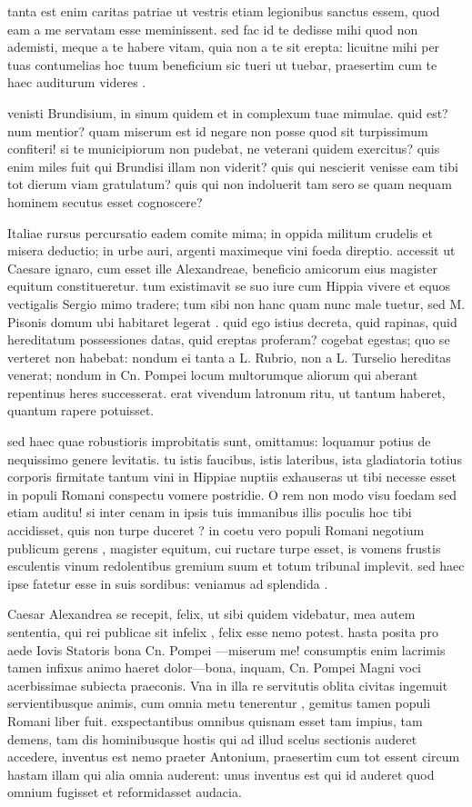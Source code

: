  tanta est enim caritas patriae ut vestris etiam legionibus sanctus essem, quod eam a me servatam esse meminissent. sed fac id te dedisse mihi quod non ademisti, meque a te habere vitam, quia non a te sit erepta: licuitne mihi per tuas contumelias hoc tuum beneficium sic tueri ut tuebar, praesertim cum te haec auditurum videres .

 venisti Brundisium, in sinum quidem et in complexum tuae mimulae. quid est? num mentior? quam miserum est id negare non posse quod sit turpissimum confiteri! si te municipiorum non pudebat, ne veterani quidem exercitus? quis enim miles fuit qui Brundisi illam non viderit? quis qui nescierit venisse eam tibi tot dierum viam gratulatum? quis qui non indoluerit tam sero se quam nequam hominem secutus esset cognoscere?

 Italiae rursus percursatio eadem comite mima; in oppida militum crudelis et misera deductio; in urbe auri, argenti maximeque vini foeda direptio. accessit ut Caesare ignaro, cum esset ille Alexandreae, beneficio amicorum eius magister equitum constitueretur. tum existimavit se suo iure cum Hippia vivere et equos vectigalis Sergio mimo tradere; tum sibi non hanc quam nunc male tuetur, sed M. Pisonis domum ubi habitaret legerat . quid ego istius decreta, quid rapinas, quid hereditatum possessiones datas, quid ereptas proferam? cogebat egestas; quo se verteret non habebat: nondum ei tanta a L. Rubrio, non a L. Turselio hereditas venerat; nondum in Cn. Pompei locum multorumque aliorum qui aberant repentinus heres successerat. erat vivendum latronum ritu, ut tantum haberet, quantum rapere potuisset.

 sed haec quae robustioris improbitatis sunt, omittamus: loquamur potius de nequissimo genere levitatis. tu istis faucibus, istis lateribus, ista gladiatoria totius corporis firmitate tantum vini in Hippiae nuptiis exhauseras ut tibi necesse esset in populi Romani conspectu vomere postridie. O rem non modo visu foedam sed etiam auditu! si inter cenam in ipsis tuis immanibus illis poculis hoc tibi accidisset, quis non turpe duceret ? in coetu vero populi Romani negotium publicum gerens , magister equitum, cui ructare turpe esset, is vomens frustis esculentis vinum redolentibus gremium suum et totum tribunal implevit. sed haec ipse fatetur esse in suis sordibus: veniamus ad splendida .

 Caesar Alexandrea se recepit, felix, ut sibi quidem videbatur, mea autem sententia, qui rei publicae sit infelix , felix esse nemo potest. hasta posita pro aede Iovis Statoris bona Cn. Pompei —miserum me! consumptis enim lacrimis tamen infixus animo haeret dolor—bona, inquam, Cn. Pompei Magni voci acerbissimae subiecta praeconis. Vna in illa re servitutis oblita civitas ingemuit servientibusque animis, cum omnia metu tenerentur , gemitus tamen populi Romani liber fuit. exspectantibus omnibus quisnam esset tam impius, tam demens, tam dis hominibusque hostis qui ad illud scelus sectionis auderet accedere, inventus est nemo praeter Antonium, praesertim cum tot essent circum hastam illam qui alia omnia auderent: unus inventus est qui id auderet quod omnium fugisset et reformidasset audacia.

